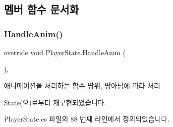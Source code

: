\subsection{멤버 함수 문서화}
\mbox{\label{class_player_state_ae57c0c11c946d701bb1e0eb2bc7204dd}} 
\subsubsection{\texorpdfstring{HandleAnim()}{HandleAnim()}}
{\footnotesize\ttfamily override void Player\+State.\+Handle\+Anim (\begin{DoxyParamCaption}{ }\end{DoxyParamCaption})\hspace{0.3cm}{\ttfamily [protected]}, {\ttfamily [virtual]}}



애니메이션을 처리하는 함수\textquotesingle{} 땅위, 땅아님에 따라 처리 



\mbox{\hyperlink{class_state_aa064ec6cd84d4a09b2c72a536125c74b}{State}}(으)로부터 재구현되었습니다.



Player\+State.\+cs 파일의 88 번째 라인에서 정의되었습니다.


